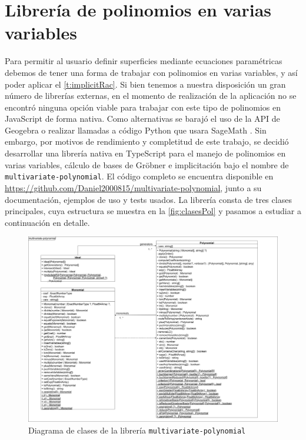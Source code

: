\section{Librería de polinomios en varias variables}
Para permitir al usuario definir superficies mediante ecuaciones paramétricas debemos de tener una forma de trabajar con polinomios en varias variables, y así poder aplicar el \autoref{t:implicitRac}. Si bien tenemos a nuestra disposición un gran número de librerías externas, en el momento de realización de la aplicación no se encontró ninguna opción viable para trabajar con este tipo de polinomios en JavaScript de forma nativa. Como alternativas se barajó el uso de la API de Geogebra \cite{geogebra} o realizar llamadas a código Python que usara SageMath \cite{sage}. Sin embargo, por motivos de rendimiento y completitud de este trabajo, se decidió desarrollar una librería nativa en TypeScript para el manejo de polinomios en varias variables, cálculo de bases de Gröbner e implicitación bajo el nombre de \texttt{multivariate-polynomial}. El código completo se encuentra disponible en \href{https://github.com/Daniel2000815/multivariate-polynomial}{https://github.com/Daniel2000815/multivariate-polynomial}, junto a su documentación, ejemplos de uso y tests usados. La librería consta de tres clases principales, cuya estructura se muestra en la \autoref{fig:clasesPol} y pasamos a estudiar a continuación en detalle.
\begin{figure}[ht!]
    \centering
    \includegraphics[width=\textwidth]{Plantilla-TFG-master/img/clasesPol.png}
    \caption{Diagrama de clases de la librería \texttt{multivariate-polynomial}}
    \label{fig:clasesPol}
\end{figure}

